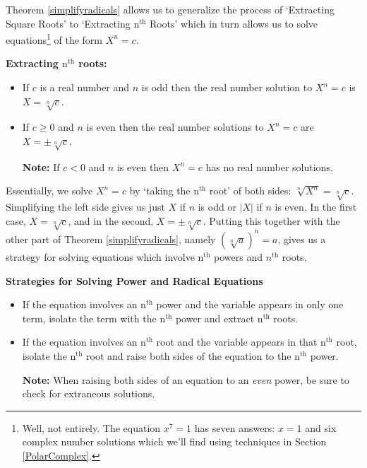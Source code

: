 \documentclass{ximera}
\begin{document}
Theorem \ref{simplifyradicals} allows us to generalize the process of `Extracting Square Roots' to `Extracting $\text{n}^{\text{th}}$ Roots' which in turn allows us to solve equations\footnote{Well, not entirely.  The equation $x^{7} = 1$ has seven answers: $x = 1$ and six complex number solutions which we'll find using techniques in Section \ref{PolarComplex}.} of the form $X^n  = c$.

\label{extractingnthroots}

\medskip

\colorbox{ResultColor}{\bbm

\centerline{\textbf{Extracting $\text{n}^{\text{th}}$ roots:}}

\begin{itemize}

\item If $c$ is a real number and $n$ is odd then the real number solution to $X^{n} = c$ is $X = \sqrt[n]{c}$.

\item  If $c \geq 0$ and $n$ is even then the real number solutions to $X^{n} = c$ are $X = \pm \sqrt[n]{c}$.

\textbf{Note:} If $c < 0$ and $n$ is even then $X^{n} = c$ has no real number solutions.

\end{itemize}

\ebm}

\medskip

Essentially, we solve $X^{n} = c$ by `taking the $\text{n}^{\text{th}}$ root' of both sides:  $\sqrt[n]{X^{n}} = \sqrt[n]{c}$. Simplifying the left side gives us just $X$ if $n$ is odd or $|X|$ if $n$ is even.  In the first case,  $X =  \sqrt[n]{c}$, and in the second, $X = \pm \sqrt[n]{c}$.  Putting this together with the other part of Theorem \ref{simplifyradicals}, namely $(\sqrt[n]{a})^n = a$, gives us a strategy for solving equations which involve $\text{n}^{\text{th}}$ powers and $n^{\text{th}}$ roots. 

\label{solvepowerandradicaleqns}

\medskip

\colorbox{ResultColor}{\bbm
\centerline{\textbf{Strategies for Solving Power and Radical Equations}}

\begin{itemize}

\item  If the equation involves an $\text{n}^{\text{th}}$ power and the variable appears in only one term, isolate the term with the $\text{n}^{\text{th}}$ power and extract $\text{n}^{\text{th}}$ roots.

\item  If the equation involves an $\text{n}^{\text{th}}$ root and the variable appears in that $\text{n}^{\text{th}}$ root, isolate the $\text{n}^{\text{th}}$ root and raise both sides of the equation to the $\text{n}^{\text{th}}$ power.

\textbf{Note:}  When raising both sides of an equation to an \textit{even} power, be sure to check for extraneous solutions.

\end{itemize}

\ebm}
\end{document}
